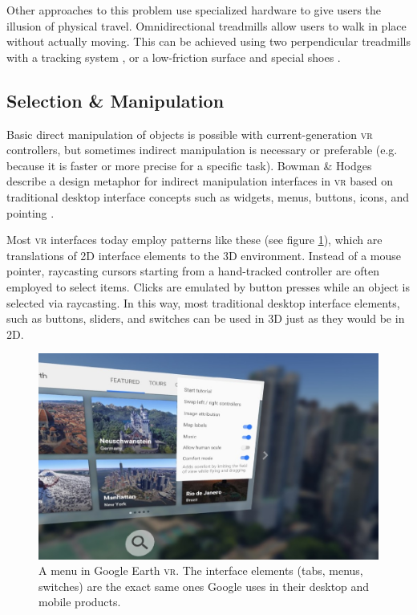 \documentclass[nobib]{tufte-book} %
\begin{document}
Other approaches to this problem use specialized hardware to give users the illusion of physical travel. Omnidirectional treadmills allow users to walk in place without actually moving. This can be achieved using two perpendicular treadmills with a tracking system \cite[-3.3cm]{darken1997omni}, or a low-friction surface and special shoes \cite[-1cm]{warren2017omni}.

\subsection{Selection \& Manipulation}
Basic direct manipulation of objects is possible with current-generation \textsc{vr} controllers, but sometimes indirect manipulation is necessary or preferable (e.g. because it is faster or more precise for a specific task). Bowman \& Hodges describe a design metaphor for indirect manipulation interfaces in \textsc{vr}  based on traditional desktop interface concepts such as widgets, menus, buttons, icons, and pointing \cite{bowman1994wimp}.

Most \textsc{vr} interfaces today employ patterns like these (see figure \ref{fig:earth-menu}), which are translations of 2D interface elements to the 3D environment. Instead of a mouse pointer, raycasting cursors starting from a hand-tracked controller are often employed to select items. Clicks are emulated by button presses while an object is selected via raycasting. In this way, most traditional desktop interface elements, such as buttons, sliders, and switches can be used in 3D just as they would be in 2D.

\begin{figure}
  \includegraphics{earth-menu.png}
  \caption{A menu in Google Earth \textsc{vr}. The interface elements (tabs, menus, switches) are the exact same ones Google uses in their desktop and mobile products.}
  \label{fig:earth-menu}
\end{figure}
\end{document}
